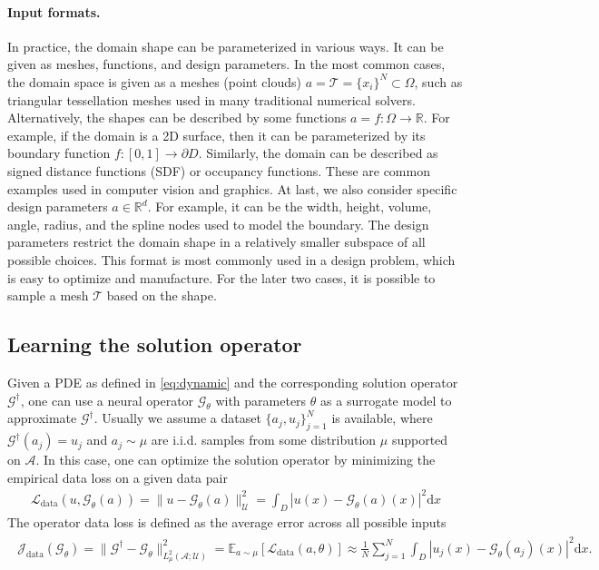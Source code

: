 \documentclass{article}
\newcommand{\R}{\mathbb{R}}
\newcommand{\E}{\mathbb{E}}
\newcommand{\G}{\mathcal{G}}
\newcommand{\Gtrue}{\mathcal{G}^{\dagger}}
\newcommand{\T}{\mathcal{T}}
\begin{document}
\paragraph{Input formats.}
In practice, the domain shape can be parameterized in various ways. It can be given as meshes, functions, and design parameters.
In the most common cases, the domain space is given as a meshes (point clouds) $a = \T = \{x_i\}^{N} \subset \Omega $, such as triangular tessellation meshes used in many traditional numerical solvers. 
Alternatively, the shapes can be described by some functions $a = f: \Omega \to \R$. For example, if the domain is a 2D surface, then it can be parameterized by its boundary function $f: [0,1]\to \partial D$. Similarly, the domain can be described as signed distance functions (SDF) or occupancy functions. These are common examples used in computer vision and graphics.
At last, we also consider specific design parameters $a \in \R^d$. For example, it can be the width, height, volume, angle, radius, and the spline nodes used to model the boundary. The design parameters restrict the domain shape in a relatively smaller subspace of all possible choices. This format is most commonly used in a design problem, which is easy to optimize and manufacture. For the later two cases, it is possible to sample a mesh $\T$ based on the shape.

\subsection{Learning the solution operator}
Given a PDE as defined in \eqref{eq:dynamic} and the corresponding solution operator \(\Gtrue\), one can use a neural operator ${\G_{\theta}}$ with parameters ${\theta}$ as a surrogate model to approximate \(\Gtrue\). 
Usually we assume a dataset $\{a_j, u_j\}_{j=1}^N$ is available, where $\Gtrue(a_j) = u_j$ and $a_j \sim \mu$ are i.i.d. samples from some distribution \(\mu\) supported on \(\mathcal{A}\). In this case, one can optimize the solution operator by minimizing the empirical data loss on a given data pair
\begin{align}
\label{eq:pinn-data}
\mathcal{L}_{\text{data}}(u, \G_\theta(a)) = \|u - \G_\theta(a)\|_{\mathcal{U}}^2= \int_D |u(x) - \G_\theta(a)(x) |^2 \mathrm{d}x
\end{align}
The operator data loss is defined as the average error across all possible inputs
\begin{align}
\label{eq:op-data}
\begin{split}
\mathcal{J}_{\text{data}}( \G_\theta) = \|\Gtrue - \G_\theta\|^2_{L^2_\mu(\mathcal{A};\mathcal{U})} = \E_{a \sim \mu}[ \mathcal{L}_{\text{data}}(a,\theta)] \approx \frac{1}{N} \sum_{j=1}^N \int_D |u_j (x) - {\G_\theta}(a_j)(x) |^2 \mathrm{d}x.
\end{split}
\end{align}
\end{document}
